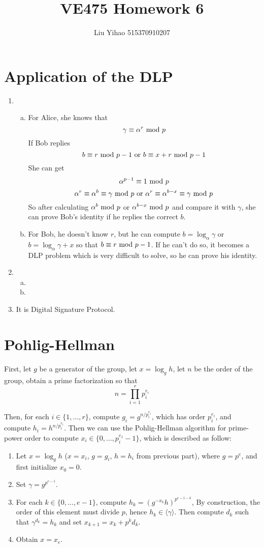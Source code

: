 \documentclass{article}
\title{VE475 Homework 6}
\author{Liu Yihao 515370910207}
\date{}
\renewcommand{\mod}{{\rm\ mod\ }}
\begin{document}
\maketitle

\section{Application of the DLP}
\begin{enumerate}
\item
\begin{enumerate}[(a)]
\item
For Alice, she knows that $$\gamma\equiv\alpha^r\mod p$$
If Bob replies $$b\equiv r\mod p-1{\rm\ or\ }b\equiv x+r\mod p-1$$
She can get $$\alpha^{p-1}\equiv 1\mod p$$
$$\alpha^r\equiv\alpha^b\equiv\gamma\mod p{\rm\ or\ }\alpha^r\equiv\alpha^{b-x}\equiv\gamma\mod p$$
So after calculating $\alpha^b\mod p$ or $\alpha^{b-x}\mod p$ and compare it with $\gamma$, she can prove Bob's identity if he replies the correct $b$.
\item 
For Bob, he doesn't know $r$, but he can compute $b=\log_\alpha\gamma$ or $b=\log_\alpha\gamma+x$ so that $b\equiv r\mod p-1$. If he can't do so, it becomes a DLP problem which is very difficult to solve, so he can prove his identity.
\end{enumerate}
\item
\begin{enumerate}[(a)]
\item
\item
\end{enumerate}
\item
It is Digital Signature Protocol.
\end{enumerate}

\section{Pohlig-Hellman}
First, let $g$ be a generator of the group, let $x=\log_gh$, let $n$ be the order of the group, obtain a prime factorization so that $$n=\prod_{i=1}^rp_i^{e_i}$$

Then, for each $i\in\{1,\dots,r\}$, compute $g_i=g^{n/p_i^{e_i}}$, which has order $p_i^{e_i}$, and compute $h_i=h^{n/p_i^{e_i}}$. Then we can use the Pohlig-Hellman algorithm for prime-power order to compute $x_i\in\{0,\dots,p_i^{e_1}-1\}$, which is described as follow:
\begin{enumerate}
\item Let $x=\log_gh$ ($x=x_i$, $g=g_i$, $h=h_i$ from previous part), where $g=p^e$, and first initialize $x_0=0$.
\item Set $\gamma=g^{p^{e-1}}$.
\item For each $k\in\{0,\dots,e-1\}$, compute $h_k=(g^{-x_k}h)^{p^{e-1-k}}$, By construction, the order of this element must divide $p$, hence $h_k\in\langle\gamma\rangle$. Then compute $d_k$ such that $\gamma^{d_k}=h_k$ and set $x_{k+1}=x_k+p^kd_k$.
\item Obtain $x=x_e$.
\end{enumerate}
\end{document}
